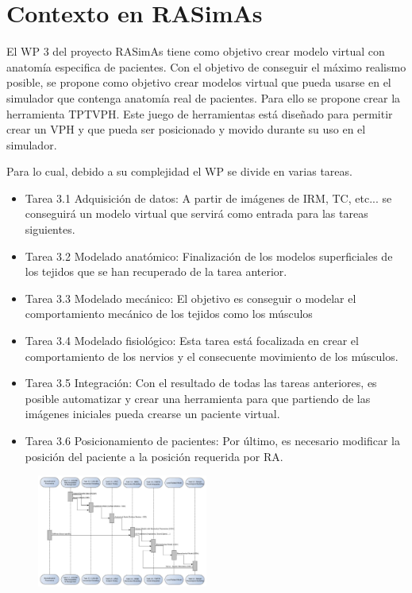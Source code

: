 \section{Contexto en RASimAs}
\label{art:rasimas}

El \ac{WP} 3 del proyecto \ac{RASimAs} tiene como objetivo crear  modelo virtual con anatomía especifica de pacientes. Con el objetivo de conseguir el máximo realismo posible, se propone como objetivo crear modelos virtual que pueda usarse en el simulador que contenga anatomía real de pacientes. Para ello se propone crear la herramienta \ac{TPTVPH}.
Este juego de herramientas está diseñado para permitir crear un \ac{VPH} y que pueda ser posicionado y movido durante su uso en el simulador.

Para lo cual, debido a su complejidad el \ac{WP} se divide en varias tareas.
\begin{itemize}
    \item Tarea 3.1 Adquisición de datos:
        A partir de imágenes de \ac{IRM}, \ac{TC}, etc... se conseguirá un modelo virtual que servirá como entrada para las tareas siguientes.
    \item Tarea 3.2 Modelado anatómico:
        Finalización de los modelos superficiales de los tejidos que se han recuperado de la tarea anterior.
    \item Tarea 3.3 Modelado mecánico:
        El objetivo es conseguir o modelar el comportamiento mecánico de los tejidos como los músculos 
    \item Tarea 3.4 Modelado fisiológico:
        Esta tarea está focalizada en crear el comportamiento de los nervios y el consecuente movimiento de los músculos. 
    \item Tarea 3.5 Integración:
        Con el resultado de todas las tareas anteriores, es posible automatizar y crear una herramienta para que partiendo de las imágenes iniciales pueda crearse un paciente virtual.
    \item Tarea 3.6 Posicionamiento de pacientes:
        Por último, es necesario modificar la posición del paciente a la posición requerida por \ac{RA}. 
\end{itemize}

\begin{figure}[h]
   \centering
    \includegraphics[width=0.5\textwidth]{IMG/RASimAs_D3.png}
    \caption{ }
   \label{fig:WP3}
\end{figure}


